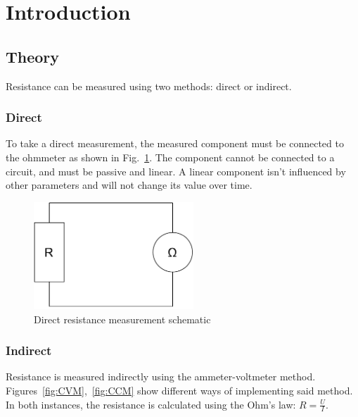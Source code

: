\section{Introduction}

\subsection{Theory}

Resistance can be measured using two methods: direct or indirect. 

\subsubsection*{Direct}

To take a direct measurement, the measured component must be connected to the ohmmeter as shown in Fig.~\ref{fig:direct_schematic}. The component cannot be connected to a circuit, and must be passive and linear. A linear component isn't influenced by other parameters and will not change its value over time.

\begin{figure}[H]
	\centering
	\includegraphics[width=6cm]{schematics/direct.pdf}
	\caption{Direct resistance measurement schematic}
	\label{fig:direct_schematic}
\end{figure}

\subsubsection*{Indirect}

Resistance is measured indirectly using the ammeter-voltmeter method. Figures~\ref{fig:CVM},~\ref{fig:CCM} show different ways of implementing said method. In both instances, the resistance is calculated using the Ohm's law: $R=\frac{U}{I}$.  

